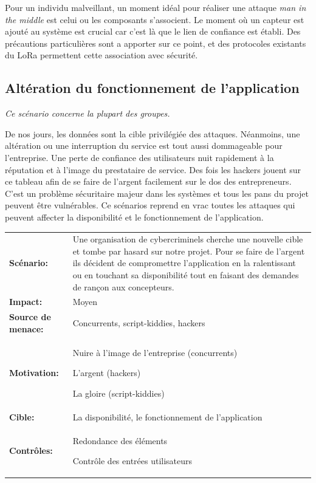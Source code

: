 \documentclass[12pt]{article}
\begin{document}
Pour un individu malveillant, un moment idéal pour réaliser une attaque \emph{man in the middle} est celui ou les composants s'associent. Le moment où un capteur est ajouté au système est crucial car c'est là que le lien de confiance est établi. Des précautions particulières sont a apporter sur ce point, et des protocoles existants du LoRa permettent cette association avec sécurité.  


\subsection{Altération du fonctionnement de l'application}

\emph{Ce scénario concerne la plupart des groupes.}
\medskip

De nos jours, les données sont la cible privilégiée des attaques. Néanmoins, une altération ou une interruption du service est tout aussi dommageable pour l'entreprise. Une perte de confiance des utilisateurs nuit rapidement à la réputation et à l'image du prestataire de service. Des fois les hackers jouent sur ce tableau afin de se faire de l'argent facilement sur le dos des entrepreneurs. C'est un problème sécuritaire majeur dans les systèmes et tous les pans du projet peuvent être vulnérables. Ce scénarios reprend en vrac toutes les attaques qui peuvent affecter la disponibilité et le fonctionnement de l'application. 
\medskip

\renewcommand{\arraystretch}{1.6}
\begin{tabular}{@{}p{4cm}p{12cm}}
\textbf{Scénario:} &  Une organisation de cybercriminels cherche une nouvelle cible et tombe par hasard sur notre projet. Pour se faire de l'argent ils décident de compromettre l'application en la ralentissant ou en touchant sa disponibilité tout en faisant des demandes de rançon aux concepteurs. \\
\textbf{Impact:} & Moyen \\
\textbf{Source de menace: } & Concurrents, script-kiddies, hackers \\
\textbf{Motivation:} & Nuire à l'image de l'entreprise (concurrents)

L'argent (hackers)

La gloire (script-kiddies)\\
\textbf{Cible:} & La disponibilité, le fonctionnement de l'application\\
\textbf{Contrôles:} & Redondance des éléments

Contrôle des entrées utilisateurs
\end{tabular}
\renewcommand{\arraystretch}{1}
\end{document}
